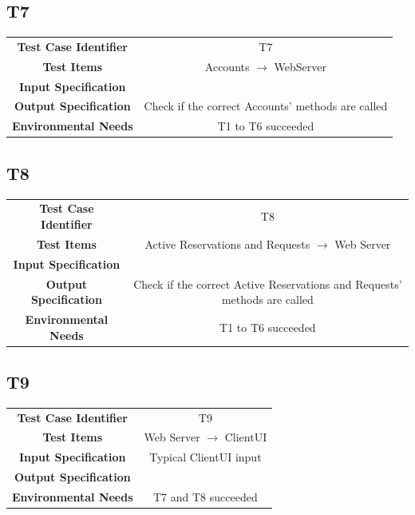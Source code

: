\documentclass{article}
\begin{document}
\subsection{T7}
\begin{adjustbox}{width=1.2\textwidth}	
	\begin{tabular}{*{2}{c}}
		\midrule
		\textbf{Test Case Identifier} & T7\\
		\textbf{Test Items} & Accounts $\rightarrow$ WebServer\\
		\textbf{Input Specification} & \\ %
		\textbf{Output Specification} & Check if the correct Accounts' methods are called\\
		\textbf{Environmental Needs} & T1 to T6 succeeded\\
		\bottomrule
	\end{tabular}
\end{adjustbox}
\subsection{T8}
\begin{adjustbox}{width=1.2\textwidth}	
	\begin{tabular}{*{2}{c}}
		\midrule
		\textbf{Test Case Identifier} & T8\\
		\textbf{Test Items} & Active Reservations and Requests $\rightarrow$ Web Server\\
		\textbf{Input Specification} & \\ %
		\textbf{Output Specification} & Check if the correct Active Reservations and Requests' methods are called\\
		\textbf{Environmental Needs} & T1 to T6 succeeded\\
		\bottomrule
	\end{tabular}
\end{adjustbox}
\subsection{T9}
\begin{adjustbox}{width=1.2\textwidth}	
	\begin{tabular}{*{2}{c}}
		\midrule
		\textbf{Test Case Identifier} & T9\\
		\textbf{Test Items} & Web Server $\rightarrow$ ClientUI\\
		\textbf{Input Specification} & Typical ClientUI input\\
		\textbf{Output Specification} & \\ %
		\textbf{Environmental Needs} & T7 and T8 succeeded\\
		\bottomrule
	\end{tabular}
\end{adjustbox}
\end{document}
